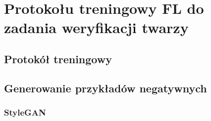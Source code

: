   \section{Protokołu treningowy FL do zadania weryfikacji twarzy}\label{sec:fedfaceid}
  \subsection{Protokół treningowy}

  \subsection{Generowanie przykładów negatywnych}
  \subsubsection{StyleGAN}
